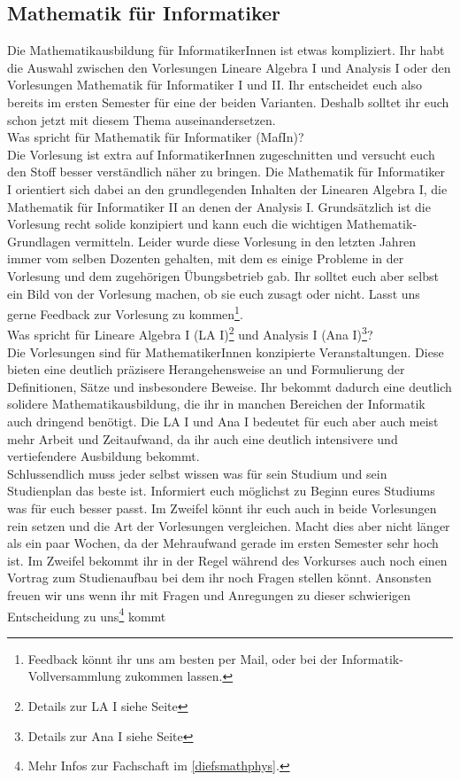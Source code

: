 \subsection{Mathematik für Informatiker}
\label{mafin}

Die Mathematikausbildung für InformatikerInnen ist etwas kompliziert. Ihr habt die Auswahl zwischen den Vorlesungen Lineare Algebra I und Analysis I oder den Vorlesungen Mathematik für Informatiker I und II. Ihr entscheidet euch also bereits im ersten Semester für eine der beiden Varianten. Deshalb solltet ihr euch schon jetzt mit diesem Thema auseinandersetzen.\\

Was spricht für Mathematik für Informatiker (MafIn)?\\
Die Vorlesung ist extra auf InformatikerInnen zugeschnitten und versucht euch den Stoff besser verständlich näher zu bringen. Die Mathematik für Informatiker I orientiert sich dabei an den grundlegenden Inhalten der Linearen Algebra I, die Mathematik für Informatiker II an denen der Analysis I. Grundsätzlich ist die Vorlesung recht solide konzipiert und kann euch die wichtigen Mathematik-Grundlagen vermitteln. Leider wurde diese Vorlesung in den letzten Jahren immer vom selben Dozenten gehalten, mit dem es einige Probleme in der Vorlesung und dem zugehörigen Übungsbetrieb gab. Ihr solltet euch aber selbst ein Bild von der Vorlesung machen, ob sie euch zusagt oder nicht. Lasst uns gerne Feedback zur Vorlesung zu kommen\footnote{Feedback könnt ihr uns am besten per Mail, oder bei der Informatik-Vollversammlung zukommen lassen.}.\\

Was spricht für Lineare Algebra I (LA I)\footnote{Details zur LA I siehe Seite \pageref{la1}} und Analysis I (Ana I)\footnote{Details zur Ana I siehe Seite \pageref{ana1}}?\\
Die Vorlesungen sind für MathematikerInnen konzipierte Veranstaltungen. Diese bieten eine deutlich präzisere Herangehensweise an und Formulierung der Definitionen, Sätze und insbesondere Beweise. Ihr bekommt dadurch eine deutlich solidere Mathematikausbildung, die ihr in manchen Bereichen der Informatik auch dringend benötigt. Die LA I und Ana I bedeutet für euch aber auch meist mehr Arbeit und Zeitaufwand, da ihr auch eine deutlich intensivere und vertiefendere Ausbildung bekommt.\\

Schlussendlich muss jeder selbst wissen was für sein Studium und sein Studienplan das beste ist. Informiert euch möglichst zu Beginn eures Studiums was für euch besser passt. Im Zweifel könnt ihr euch auch in beide Vorlesungen rein setzen und die Art der Vorlesungen vergleichen. Macht dies aber nicht länger als ein paar Wochen, da der Mehraufwand gerade im ersten Semester sehr hoch ist. Im Zweifel bekommt ihr in der Regel während des Vorkurses auch noch einen Vortrag zum Studienaufbau bei dem ihr noch Fragen stellen könnt. Ansonsten freuen wir uns wenn ihr mit Fragen und Anregungen zu dieser schwierigen Entscheidung zu uns\footnote{Mehr Infos zur Fachschaft im \autoref{diefsmathphys}.} kommt
